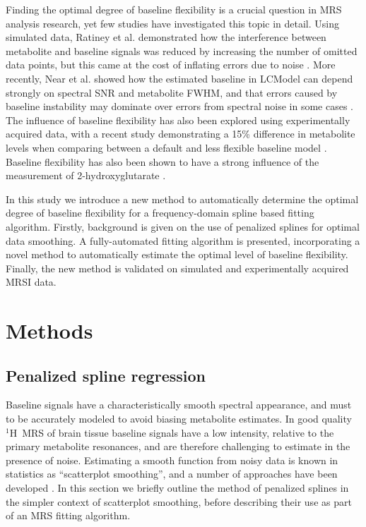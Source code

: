 \documentclass[num-refs]{wiley-article}
\newcommand{\proton}{\ensuremath{^1\mathrm{H}}}
\begin{document}
Finding the optimal degree of baseline flexibility is a crucial question in MRS analysis research, yet few studies have investigated this topic in detail. Using simulated data, Ratiney et al. demonstrated how the interference between metabolite and baseline signals was reduced by increasing the number of omitted data points, but this came at the cost of inflating errors due to noise \cite{Ratiney2004}. More recently, Near et al. showed how the estimated baseline in LCModel can depend strongly on spectral SNR and metabolite FWHM, and that errors caused by baseline instability may dominate over errors from spectral noise in some cases \cite{Near2013}. The influence of baseline flexibility has also been explored using experimentally acquired data, with a recent study demonstrating a 15\% difference in metabolite levels when comparing between a default and less flexible baseline model \cite{Giapitzakis2019}. Baseline flexibility has also been shown to have a strong influence of the measurement of 2-hydroxyglutarate \cite{Wenger2019}.

In this study we introduce a new method to automatically determine the optimal degree of baseline flexibility for a frequency-domain spline based fitting algorithm. Firstly, background is given on the use of penalized splines for optimal data smoothing. A fully-automated fitting algorithm is presented, incorporating a novel method to automatically estimate the optimal level of baseline flexibility. Finally, the new method is validated on simulated and experimentally acquired MRSI data.

\section{Methods}
\subsection{Penalized spline regression}

Baseline signals have a characteristically smooth spectral appearance, and must to be accurately modeled to avoid biasing metabolite estimates. In good quality \proton\ MRS of brain tissue baseline signals have a low intensity, relative to the primary metabolite resonances, and are therefore challenging to estimate in the presence of noise. Estimating a smooth function from noisy data is known in statistics as ``scatterplot smoothing'', and a number of approaches have been developed \cite{Ruppert2003}. In this section we briefly outline the method of penalized splines in the simpler context of scatterplot smoothing, before describing their use as part of an MRS fitting algorithm.
\end{document}
